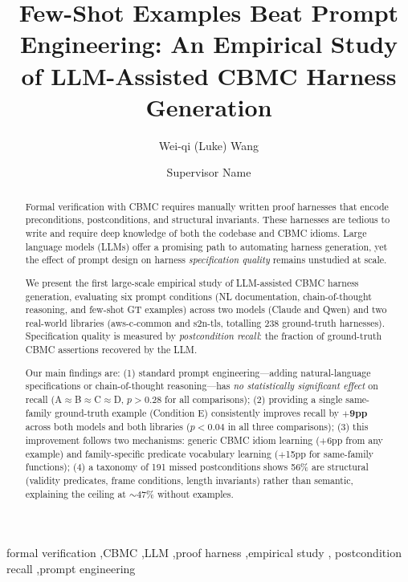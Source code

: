 \documentclass[review]{elsarticle}
\begin{document}
\begin{frontmatter}

\title{Few-Shot Examples Beat Prompt Engineering: An Empirical Study of LLM-Assisted CBMC Harness Generation}

\author[addr1]{Wei-qi (Luke) Wang}
\author[addr1]{Supervisor Name}

\address[addr1]{University Affiliation}

\begin{abstract}
Formal verification with CBMC requires manually written proof harnesses that encode
preconditions, postconditions, and structural invariants. These harnesses are tedious to
write and require deep knowledge of both the codebase and CBMC idioms. Large language models
(LLMs) offer a promising path to automating harness generation, yet the effect of prompt
design on harness \emph{specification quality} remains unstudied at scale.

We present the first large-scale empirical study of LLM-assisted CBMC harness generation,
evaluating six prompt conditions (NL documentation, chain-of-thought reasoning, and
few-shot GT examples) across two models (Claude and Qwen) and two real-world libraries
(aws-c-common and s2n-tls, totalling 238 ground-truth harnesses). Specification quality
is measured by \emph{postcondition recall}: the fraction of ground-truth CBMC assertions
recovered by the LLM.

Our main findings are: (1) standard prompt engineering—adding natural-language
specifications or chain-of-thought reasoning—has \emph{no statistically significant
effect} on recall (A$\approx$B$\approx$C$\approx$D, $p>0.28$ for all comparisons);
(2) providing a single same-family ground-truth example (Condition E) consistently
improves recall by \textbf{$+$9pp} across both models and both libraries ($p<0.04$ in
all three comparisons); (3) this improvement follows two mechanisms: generic CBMC idiom
learning ($+$6pp from any example) and family-specific predicate vocabulary learning
($+$15pp for same-family functions); (4) a taxonomy of 191 missed postconditions shows
56\% are structural (validity predicates, frame conditions, length invariants) rather
than semantic, explaining the ceiling at $\sim$47\% without examples.
\end{abstract}

\begin{keyword}
formal verification \sep CBMC \sep LLM \sep proof harness \sep empirical study \sep
postcondition recall \sep prompt engineering
\end{keyword}

\end{frontmatter}
\end{document}
